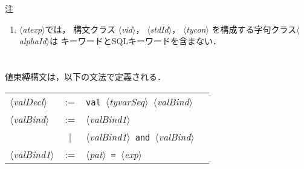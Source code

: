 \documentclass{jbook}
\newif\ifjp
\newcommand{\txt}[2]{#2}
\newcommand{\vbar}{\mbox{\ $|$\ }}
\newcommand{\nonterm}[1]{\mbox{$\langle$}{\it #1}\mbox{$\rangle$}}
\newcommand{\term}[1]{\mbox{{\tt #1}}}
\begin{document}
注
\begin{enumerate}
\item \nonterm{atexp}では，
構文クラス
\nonterm{vid}，
\nonterm{stdId}，
\nonterm{tycon}
を構成する字句クラス\nonterm{alphaId}は
キーワードとSQLキーワードを含まない．
\end{enumerate}

\else%
\fi%

\chapter{\txt{宣言の構文と評価}{}}

\section{\txt{値束縛}{}}
\label{sec:valBinds}
\ifjp%

	宣言の種類毎に，宣言\nonterm{decl}の定義と，それに対応するインター
フェイス仕様\nonterm{interfaceSpec}の定義を与え，それら宣言に対してコン
パイラが計算する型と値を説明する．

	本節では，値束縛を説明する．
\else%
\fi%

\label{sec:syntax:valBind}
\section{\txt{値束縛宣言 \nonterm{valBind}}{}}
\ifjp%
	値束縛構文は，以下の文法で定義される．

\begin{center}
\begin{tabular}{lcll}
\nonterm{valDecl}  &:=   & \term{val}\ \nonterm{tyvarSeq}\ \nonterm{valBind}\\
\nonterm{valBind}  &:=   & \nonterm{valBind1} \\
                   &\vbar& \nonterm{valBind1}\ \term{and}\ \nonterm{valBind}
\\
\nonterm{valBind1} &:=   & \nonterm{pat}\ \term{=}\ \nonterm{exp}\\
\end{tabular}
\end{center}
\end{document}
